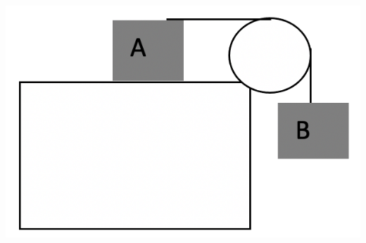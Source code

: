 \documentclass[12pt]{article}
\newcommand{\soln}[1] {\textit{Solution:} #1}
\renewcommand{\soln}[1] {}
\begin{document}
\begin{enumerate}
\centerline{\includegraphics[width=.3\textwidth]{modified_atwood.png}}

\soln{

Now the coordinates matter a bit more.

Since the motion itself is 1-d, I'll make the direction of actual motion positive, that way my acceleration components will be all positive and I'm not in danger of forgetting a minus sign.

I'm going use the usual coordinate system for $A$, that is, $x$ points right, $y$ points up. That way, my acceleration $\vec a_A = a_{A,x} \hat x$, $a_{A_x}$ is positive and hence the magnitude of acceleration is also $a_A = a_{A,x}$. For block $B$, I'll make the direction of motion to be the positive direction as well, ie., down is positive. That way the acceleration of $B$ will be positive as well, and it will equal that of $A$, since $A$ and $B$ are connected by a string of constant length: $B$ moves down just as far as $A$ moves to the right, in the same amount of time, so they always have the same velocity and same acceleration which I will just call $a$.

[It is just as fine to use the "usual" coordinate system everywhere. In that case, one has to be a bit more careful and put in a minus sign, since $B$ is moving down: $a_{A,x} = - a_{B, y}$.]

I will use the same FBD (see above). Since block $A$ is sliding, the force of friction changes to kinetic, and I have to use Newton's 2nd Law since there is acceleration.
\begin{align}
0 &= F_{net, y, on\, A} = F_{N} - m_A g\\
m_A a &= F_{net, x, on\, A} = F_T - F_{fk}\\
m_B a &= F_{net, y, on\, B} = m_B g - F_T
\end{align}

Overall, I have 4 unknowns ($a, F_N, F_T, F_{fk}$), but I also have an additional equation for kinetic friction, so things look promising.

The first equation again gives me my normal force $F_N = m_A g$, which I'll need for the friction $F_{fk} = \mu_k F_N = \mu_k m_A g$.
I'll then add the bottom two equations together, because that way, $F_T$ will drop out:

}
\end{enumerate}
\end{document}
